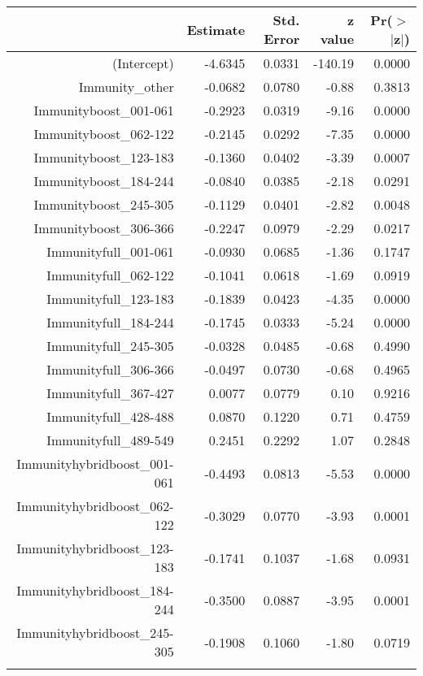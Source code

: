 \begin{table}[ht]
\centering
\begin{tabular}{rrrrr}
  \hline
 & Estimate & Std. Error & z value & Pr($>$$|$z$|$) \\ 
  \hline
(Intercept) & -4.6345 & 0.0331 & -140.19 & 0.0000 \\ 
  Immunity\_other & -0.0682 & 0.0780 & -0.88 & 0.3813 \\ 
  Immunityboost\_001-061 & -0.2923 & 0.0319 & -9.16 & 0.0000 \\ 
  Immunityboost\_062-122 & -0.2145 & 0.0292 & -7.35 & 0.0000 \\ 
  Immunityboost\_123-183 & -0.1360 & 0.0402 & -3.39 & 0.0007 \\ 
  Immunityboost\_184-244 & -0.0840 & 0.0385 & -2.18 & 0.0291 \\ 
  Immunityboost\_245-305 & -0.1129 & 0.0401 & -2.82 & 0.0048 \\ 
  Immunityboost\_306-366 & -0.2247 & 0.0979 & -2.29 & 0.0217 \\ 
  Immunityfull\_001-061 & -0.0930 & 0.0685 & -1.36 & 0.1747 \\ 
  Immunityfull\_062-122 & -0.1041 & 0.0618 & -1.69 & 0.0919 \\ 
  Immunityfull\_123-183 & -0.1839 & 0.0423 & -4.35 & 0.0000 \\ 
  Immunityfull\_184-244 & -0.1745 & 0.0333 & -5.24 & 0.0000 \\ 
  Immunityfull\_245-305 & -0.0328 & 0.0485 & -0.68 & 0.4990 \\ 
  Immunityfull\_306-366 & -0.0497 & 0.0730 & -0.68 & 0.4965 \\ 
  Immunityfull\_367-427 & 0.0077 & 0.0779 & 0.10 & 0.9216 \\ 
  Immunityfull\_428-488 & 0.0870 & 0.1220 & 0.71 & 0.4759 \\ 
  Immunityfull\_489-549 & 0.2451 & 0.2292 & 1.07 & 0.2848 \\ 
  Immunityhybridboost\_001-061 & -0.4493 & 0.0813 & -5.53 & 0.0000 \\ 
  Immunityhybridboost\_062-122 & -0.3029 & 0.0770 & -3.93 & 0.0001 \\ 
  Immunityhybridboost\_123-183 & -0.1741 & 0.1037 & -1.68 & 0.0931 \\ 
  Immunityhybridboost\_184-244 & -0.3500 & 0.0887 & -3.95 & 0.0001 \\ 
  Immunityhybridboost\_245-305 & -0.1908 & 0.1060 & -1.80 & 0.0719 \\ 
$$
\end{tabular}
\end{table}
